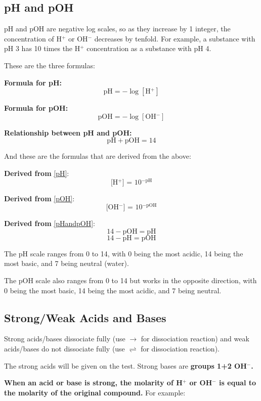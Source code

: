 \documentclass[a4paper, 12pt]{article}
\begin{document}
\subsection{pH and pOH}
pH and pOH are negative log scales, so as they increase by 1 integer, the concentration of H$^+$ or OH$^-$ decreases by tenfold. For example, a substance with pH 3 has 10 times the H$^+$ concentration as a substance with pH 4.

These are the three formulas:

\textbf{Formula for pH:}
\begin{equation}\label{pH}
    \text{pH} = -\log[\text{H$^+$}]
\end{equation}

\textbf{Formula for pOH:}
\begin{equation}\label{pOH}
\text{pOH} = -\log[\text{OH$^-$}]
\end{equation}

\textbf{Relationship between pH and pOH:}
\begin{equation}\label{pHandpOH}
    \text{pH} + \text{pOH} = 14
\end{equation}

And these are the formulas that are derived from the above:

\textbf{Derived from} \ref{pH}:
$$ \text{[H$^+$] = 10$^{-\text{pH}}$}$$

\textbf{Derived from} \ref{pOH}:
$$ \text{[OH$^-$] = 10$^{-\text{pOH}}$}$$

\textbf{Derived from} \ref{pHandpOH}:
$$14 - \text{pOH} = \text{pH}$$
$$14 - \text{pH} = \text{pOH} $$

The pH scale ranges from 0 to 14, with 0 being the most acidic, 14 being the most basic, and 7 being neutral (water).

The pOH scale also ranges from 0 to 14 but works in the opposite direction, with 0 being the most basic, 14 being the most acidic, and 7 being neutral.

\subsection{Strong/Weak Acids and Bases}
Strong acids/bases dissociate fully (use $\longrightarrow$ for dissociation reaction) and weak acids/bases do not dissociate fully (use $\rightleftharpoons$ for dissociation reaction).

The strong acids will be given on the test. Strong bases are \textbf{groups 1+2 OH$^-$.}

\textbf{When an acid or base is strong, the molarity of H$^+$ or OH$^-$ is equal to the molarity of the original compound.} For example:
\end{document}

